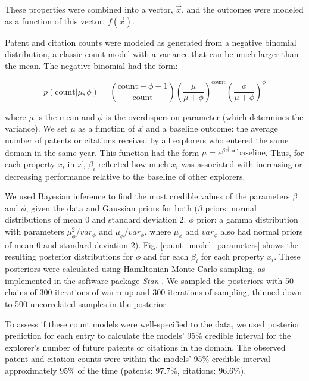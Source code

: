 \documentclass{dsj}
\begin{document}
These properties were combined into a vector, $\vec{x}$, and the outcomes were modeled as a function of this vector, $f(\vec{x})$.

Patent and citation counts were modeled as generated from a negative binomial distribution, a classic count model with a variance that can be much larger than the mean. The negative binomial had the form:

\begin{equation}
    p(\text{count}|\mu, \phi) = {\text{count} + \phi -1 \choose \text{count}} \left(\frac{\mu}{\mu+\phi}\right)^{\text{count}} \left(\frac{\phi}{\mu+\phi}\right)^{\phi}
\end{equation}

where $\mu$ is the mean and $\phi$ is the overdispersion parameter (which determines the variance). We set $\mu$ as a function of $\vec{x}$ and a baseline outcome: the average number of patents or citations received by all explorers who entered the same domain in the same year. This function had the form $\mu = e^{\beta \vec{x}}*\text{baseline}$. Thus, for each property $x_i$ in $\vec{x}$, $\beta_i$ reflected how much $x_i$ was associated with increasing or decreasing performance relative to the baseline of other explorers.

We used Bayesian inference to find the most credible values of the parameters $\beta$ and $\phi$, given the data and Gaussian priors for both ($\beta$ priors: normal distributions of mean 0 and standard deviation 2. $\phi$ prior: a gamma distribution with parameters $\mu_{\phi}^{2}/var_{\phi}$ and $\mu_{\phi}/var_{\phi}$, where $\mu_{\phi}$ and $var_{\phi}$ also had normal priors of mean 0 and standard deviation 2). Fig. \ref{count_model_parameters} shows the resulting posterior distributions for $\phi$ and for each $\beta_i$ for each property $x_i$. These posteriors were calculated using Hamiltonian Monte Carlo sampling, as implemented in the software package \textit{Stan} \cite{Carpenter2016}. We sampled the posteriors with 50 chains of 300 iterations of warm-up and 300 iterations of sampling, thinned down to 500 uncorrelated samples in the posterior. 

To assess if these count models were well-specified to the data, we used posterior prediction for each entry to calculate the models' 95\% credible interval for the explorer's number of future patents or citations in the domain. The observed patent and citation counts were within the models' 95\% credible interval approximately 95\% of the time (patents: 97.7\%, citations: 96.6\%).
\end{document}
